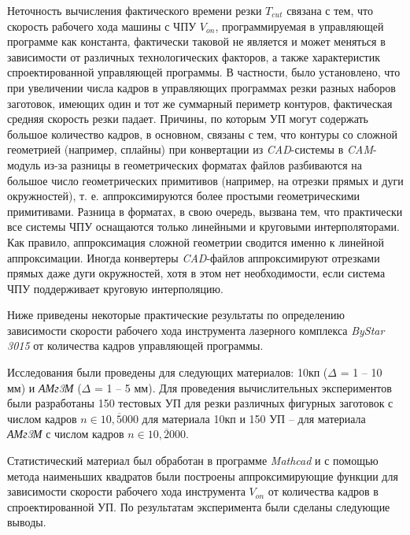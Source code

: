 \documentclass[11pt,twoside,openany]{report}
\begin{document}
Неточность вычисления фактического времени резки
$T_{cut}$
связана с тем, что скорость рабочего хода машины с ЧПУ
$V_{on}$,
программируемая в управляющей программе как константа,
фактически таковой не является и может меняться
в зависимости от различных технологических факторов,
а также характеристик спроектированной управляющей программы.
В частности, было установлено,
что при увеличении числа кадров в управляющих программах
резки разных наборов заготовок,
имеющих один и тот же суммарный периметр контуров,
фактическая средняя скорость резки падает.
Причины, по которым УП могут содержать большое количество кадров,
в основном, связаны с тем, что контуры со сложной геометрией
(например, сплайны) при конвертации из
{\it CAD}-системы в
{\it CAM}-модуль из-за разницы в геометрических форматах файлов
разбиваются на большое число геометрических примитивов
(например, на отрезки прямых и дуги окружностей),
т. е. аппроксимируются более простыми геометрическими примитивами.
Разница в форматах, в свою очередь,
вызвана тем, что практически все системы ЧПУ
оснащаются только линейными и круговыми интерполяторами.
Как правило, аппроксимация сложной геометрии сводится
именно к линейной аппроксимации.
Иногда конвертеры
{\it CAD}-файлов аппроксимируют отрезками прямых
даже дуги окружностей, хотя в этом нет необходимости,
если система ЧПУ поддерживает круговую интерполяцию.

Ниже приведены некоторые практические результаты
по определению зависимости скорости рабочего хода
инструмента лазерного комплекса
{\it ByStar 3015}
от количества кадров управляющей программы.

Исследования были проведены для следующих материалов:
10кп ($\Delta$ = 1 -- 10 мм)
и {\it АМг3М} ($\Delta$ = 1 -- 5 мм).
Для проведения вычислительных экспериментов были разработаны
150 тестовых УП для резки различных фигурных заготовок с числом кадров
$n \in \overline{10,5000}$
для материала 10кп
и 150 УП -- для материала
{\it АМг3М} с числом кадров
$n \in \overline{10,2000}$.

Статистический материал был обработан в программе
{\it Mathcad}
и с помощью метода наименьших квадратов были построены
аппроксимирующие функции для зависимости скорости
рабочего хода инструмента
$V_{on}$
от количества кадров в спроектированной УП.
По результатам эксперимента были сделаны следующие выводы.
\end{document}
